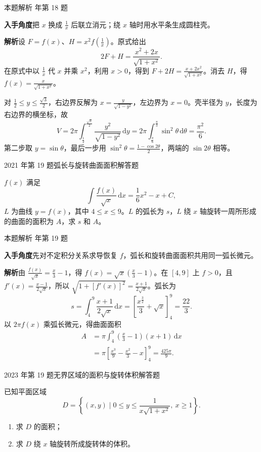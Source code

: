 \documentclass[UTF8,zihao=-4,fontset=fandol]{ctexart}
\newcommand{\QuestionPage}[6]{%
  \par\noindent\begin{minipage}{\linewidth}
  \raggedright
  {\small\textcolor{black!60}{#3\quad #5}\hfill\textcolor{accent}{#2}}\par\smallskip}
\newcommand{\QuestionEnd}{\end{minipage}\par\medskip}
\newcommand{\QuestionPage}[6]{%
  \clearpage
  {\small\textcolor{accent}{#1\hfill #2}}\par\medskip
  {\small\textcolor{black!60}{#3\quad #5\hfill #6}}\par\vspace{9bp}}
\newcommand{\QuestionEnd}{}
\newenvironment{QuestionSolution}[1]{%
  \clearpage
  {\small\textcolor{black!60}{本题解析\quad #1}}\par\medskip
}{\par\clearpage}
\begin{document}
\begin{QuestionSolution}{2020 年第 18 题}
\textbf{入手角度}\quad 把 \(x\) 换成 \(\frac{1}{x}\) 后联立消元；绕 \(x\) 轴时用水平条生成圆柱壳。

\textbf{解析}\quad 设 \(F=f(x)\)、\(H=x^2f(\frac{1}{x})\)。原式给出
\[
2F+H=\frac{x^2+2x}{\sqrt{1+x^2}}.
\]
在原式中以 \(\frac{1}{x}\) 代 \(x\) 并乘 \(x^2\)，利用 \(x>0\)，得到 \(F+2H=\frac{x+2x^2}{\sqrt{1+x^2}}\)。消去 \(H\)，得 \(\boxed{f(x)=\frac{x}{\sqrt{1+x^2}}}\)。

对 \(\frac{1}{2}\le y\le\frac{\sqrt3}{2}\)，右边界反解为 \(x=\frac{y}{\sqrt{1-y^2}}\)，左边界为 \(x=0\)。壳半径为 \(y\)，长度为右边界的横坐标，故
\[
V=2\pi\int_{\frac{1}{2}}^{\frac{\sqrt3}{2}}\frac{y^2}{\sqrt{1-y^2}}\,\mathrm{d}y
=2\pi\int_{\frac{\pi}{6}}^{\frac{\pi}{3}}\sin^2\theta\,\mathrm{d}\theta
=\boxed{\frac{\pi^2}{6}}.
\]
第二步取 \(y=\sin\theta\)，最后一步用 \(\sin^2\theta=\frac{1-\cos2\theta}{2}\)，两端的 \(\sin2\theta\) 相等。
\end{QuestionSolution}

\QuestionPage{3.4 定积分的应用}{解答题}{2021 年第 19 题}{3}{弧长与旋转曲面面积}{185 / 234}
\(f(x)\) 满足
\[\int \frac{f(x)}{\sqrt{x}} \,\mathrm{d}x=\frac{1}{6}x^{2}-x+C,
\]
\(L\) 为曲线 \(y=f(x)\)，其中 \(4 \le x \le 9\)。\(L\) 的弧长为 \(s\)，\(L\) 绕 \(x\) 轴旋转一周所形成的曲面的面积为 \(A\)，求 \(s\) 和 \(A\)。
\QuestionEnd

\begin{QuestionSolution}{2021 年第 19 题}
\textbf{入手角度}\quad 先对不定积分关系求导恢复 \(f\)，弧长和旋转曲面面积共用同一弧长微元。

\textbf{解析}\quad 由 \(\frac{f(x)}{\sqrt{x}}=\frac{x}{3}-1\)，得 \(f(x)=\sqrt{x}(\frac{x}{3}-1)\)。在 \([4,9]\) 上 \(f>0\)，且 \(f'(x)=\frac{x-1}{2\sqrt{x}}\)，所以 \(\sqrt{1+[f'(x)]^2}=\frac{x+1}{2\sqrt{x}}\)。弧长为
\[
s=\int_4^9\frac{x+1}{2\sqrt{x}}\,\mathrm{d}x
=\left[\frac{x^{\frac{3}{2}}}3+\sqrt{x}\right]_4^9
=\boxed{\frac{22}{3}}.
\]
以 \(2\pi f(x)\) 乘弧长微元，得曲面面积
\[
\begin{aligned}
A&=\pi\int_4^9(\frac{x}{3}-1)(x+1)\,\mathrm{d}x\\
&=\pi\left[\frac{x^3}{9}-\frac{x^2}{3}-x\right]_4^9
=\boxed{\frac{425\pi}{9}}.
\end{aligned}
\]
\end{QuestionSolution}

\QuestionPage{3.4 定积分的应用}{解答题}{2023 年第 19 题}{3}{无界区域的面积与旋转体积}{186 / 234}
已知平面区域
\[D=\left\{(x,y)\mid 0\le y\le \frac{1}{x\sqrt{1+x^2}},\ x\ge 1\right\}.
\]
\begin{enumerate}
\item 求 \(D\) 的面积；
\item 求 \(D\) 绕 \(x\) 轴旋转所成旋转体的体积。
\end{enumerate}
\QuestionEnd
\end{document}
